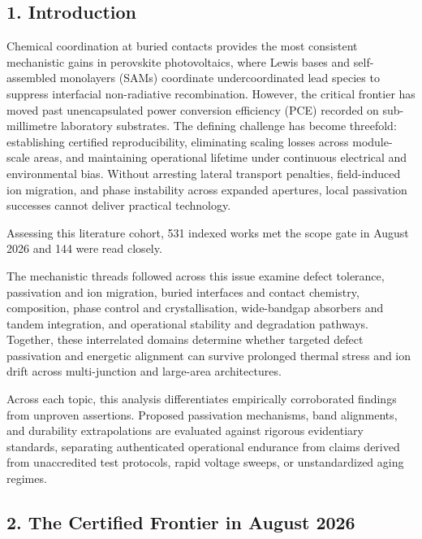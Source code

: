 \documentclass[
  11pt,
]{article}
\begin{document}
\subsection{1. Introduction}\label{introduction}

Chemical coordination at buried contacts provides the most consistent
mechanistic gains in perovskite photovoltaics, where Lewis bases and
self-assembled monolayers (SAMs) coordinate undercoordinated lead
species to suppress interfacial non-radiative recombination. However,
the critical frontier has moved past unencapsulated power conversion
efficiency (PCE) recorded on sub-millimetre laboratory substrates. The
defining challenge has become threefold: establishing certified
reproducibility, eliminating scaling losses across module-scale areas,
and maintaining operational lifetime under continuous electrical and
environmental bias. Without arresting lateral transport penalties,
field-induced ion migration, and phase instability across expanded
apertures, local passivation successes cannot deliver practical
technology.

Assessing this literature cohort, 531 indexed works met the scope gate
in August 2026 and 144 were read closely.

The mechanistic threads followed across this issue examine defect
tolerance, passivation and ion migration, buried interfaces and contact
chemistry, composition, phase control and crystallisation, wide-bandgap
absorbers and tandem integration, and operational stability and
degradation pathways. Together, these interrelated domains determine
whether targeted defect passivation and energetic alignment can survive
prolonged thermal stress and ion drift across multi-junction and
large-area architectures.

Across each topic, this analysis differentiates empirically corroborated
findings from unproven assertions. Proposed passivation mechanisms, band
alignments, and durability extrapolations are evaluated against rigorous
evidentiary standards, separating authenticated operational endurance
from claims derived from unaccredited test protocols, rapid voltage
sweeps, or unstandardized aging regimes.

\subsection{2. The Certified Frontier in August
2026}\label{the-certified-frontier-in-august-2026}
\end{document}
